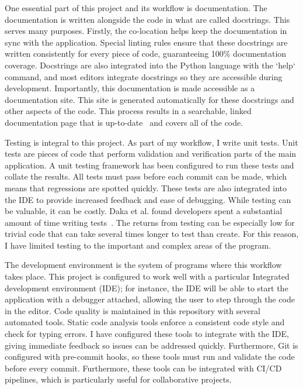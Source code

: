 \documentclass[]{final_report}
\begin{document}
One essential part of this project and its workflow is documentation. The documentation is written alongside the code in what are called docstrings. This serves many purposes. Firstly, the co-location helps keep the documentation in sync with the application. Special linting rules ensure that these docstrings are written consistently for every piece of code, guaranteeing 100\% documentation coverage. Docstrings are also integrated into the Python language with the `help` command, and most editors integrate docstrings so they are accessible during development. Importantly, this documentation is made accessible as a documentation site. This site is generated automatically for these docstrings and other aspects of the code. This process results in a searchable, linked documentation page that is up-to-date~\cite{pythonAutoDoc} and covers all of the code. 

\newpage
Testing is integral to this project. As part of my workflow, I write unit tests. Unit tests are pieces of code that perform validation and verification parts of the main application. A unit testing framework has been configured to run these tests and collate the results. All tests must pass before each commit can be made, which means that regressions are spotted quickly. These tests are also integrated into the IDE to provide increased feedback and ease of debugging. While testing can be valuable, it can be costly. Daka et al. found developers spent a substantial amount of time writing tests~\cite{unitTestingSurvey}. The returns from testing can be especially low for trivial code that can take several times longer to test than create. For this reason, I have limited testing to the important and complex areas of the program.  

The development environment is the system of programs where this workflow takes place. This project is configured to work well with a particular Integrated development environment (IDE); for instance, the IDE will be able to start the application with a debugger attached, allowing the user to step through the code in the editor. Code quality is maintained in this repository with several automated tools. Static code analysis tools enforce a consistent code style and check for typing errors. I have configured these tools to integrate with the IDE, giving immediate feedback so issues can be addressed quickly. Furthermore, Git is configured with pre-commit hooks, so these tools must run and validate the code before every commit. Furthermore, these tools can be integrated with CI/CD pipelines, which is particularly useful for collaborative projects.
\end{document}
